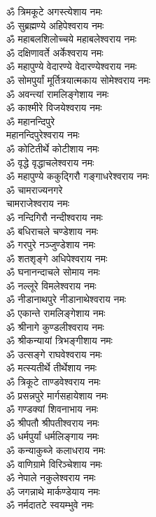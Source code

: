\begin{multicols}{2}
\begin{flushleft}
ॐ त्रिमकूटे अगस्त्येशाय नमः\\
ॐ सुब्रह्मण्ये अहिपेश्वराय नमः\\
ॐ महाबलशिलोच्चये महाबलेश्वराय नमः\\
ॐ दक्षिणावर्ते अर्केश्वराय नमः\\
ॐ महापुण्ये वेदारण्ये वेदारण्येश्वराय नमः\\
ॐ सोमपुर्यां मूर्तित्रयात्मकाय  सोमेश्वराय नमः\\
ॐ अवन्त्यां रामलिङ्गेशाय नमः\hfill{}\\
ॐ काश्मीरे विजयेश्वराय नमः\\
ॐ महानन्दिपुरे\\ महानन्दिपुरेश्वराय नमः\\
ॐ कोटितीर्थे कोटीशाय नमः\\
ॐ वृद्धे वृद्धाचलेश्वराय नमः\\
ॐ महापुण्ये ककुद्गिरौ गङ्गाधरेश्वराय नमः\\
ॐ चामराज्यनगरे\\ चामराजेश्वराय नमः\\
ॐ नन्दिगिरौ नन्दीश्वराय नमः\\
ॐ बधिराचले चण्डेशाय नमः\\
ॐ गरपुरे नञ्जुण्डेशाय नमः\\
ॐ शतशृङ्गे अधिपेश्वराय नमः\hfill{}\\
ॐ घनानन्दाचले सोमाय नमः\\
ॐ नल्लूरे विमलेश्वराय नमः\\
ॐ नीडानाथपुरे नीडानाथेश्वराय नमः\\
ॐ एकान्ते रामलिङ्गेशाय नमः\\
ॐ श्रीनागे कुण्डलीश्वराय नमः\\
ॐ श्रीकन्यायां त्रिभङ्गीशाय नमः\\
ॐ उत्सङ्गे राघवेश्वराय नमः\\
ॐ मत्स्यतीर्थे तीर्थेशाय नमः\\
ॐ त्रिकूटे ताण्डवेश्वराय नमः\\
ॐ प्रसन्नपुरे मार्गसहायेशाय नमः\hfill{}\\
ॐ गण्डक्यां शिवनाभाय नमः\\
ॐ श्रीपतौ श्रीपतीश्वराय नमः\\
ॐ धर्मपुर्यां धर्मलिङ्गाय नमः\\
ॐ कन्याकुब्जे कलाधराय नमः\\
ॐ वाणिग्रामे विरिञ्चेशाय नमः\\
ॐ नेपाले नकुलेश्वराय नमः\\
ॐ जगन्नाथे मार्कण्डेयाय नमः\\
ॐ नर्मदातटे स्वयम्भुवे नमः\\

\end{flushleft}
\end{multicols}
